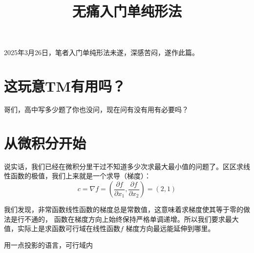 \documentclass{ctexart}
\title{无痛入门单纯形法}
\author{}
\begin{document}
\maketitle

2025年3月26日，笔者入门单纯形法未遂，深感苦闷，遂作此篇。

\section{这玩意TM有用吗？}
哥们，高中写多少题了你也没问，现在问有没有用有必要吗？

\section{从微积分开始}

说实话，我们已经在微积分里干过不知道多少次求最大最小值的问题了。区区求线性函数的极值，我们上来就是一个求导（梯度）：
\[
    c = \nabla f =\left( \frac{\partial f}{\partial x_1},
    \frac{\partial f}{\partial x_2} \right) = (2,1)
\]

我们发现，非常函数线性函数的梯度总是常数值，这意味着求梯度使其等于零的做法是行不通的，
函数在梯度方向上始终保持严格单调递增。所以我们要求最大值，实际上是求函数可行域在线性函数\(f\) 梯度方向最远能延伸到哪里。

用一点投影的语言，可行域内
\end{document}
